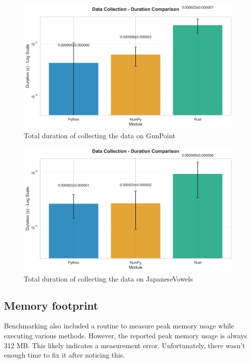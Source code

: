 \documentclass[review]{AIM_report}
\begin{document}
\begin{figure}[H]
    \centering
    \includegraphics[width=\figsize\textwidth]{files/benchmarking/methods_gunpoint/data_collection_comparison.png}
    \caption{Total duration of collecting the data on GunPoint}
    \label{fig:gun-col}
\end{figure}
\begin{figure}[H]
    \centering
    \includegraphics[width=\figsize\textwidth]{files/benchmarking/methods_vowels/data_collection_comparison.png}
    \caption{Total duration of collecting the data on JapaneseVowels}
    \label{fig:vowel-col}
\end{figure}

\subsection{Memory footprint}
Benchmarking also included a routine to measure peak memory usage while executing various methods. However, the reported peak memory usage is always 312 MB. This likely indicates a measurement error. Unfortunately, there wasn't enough time to fix it after noticing this.
\end{document}
